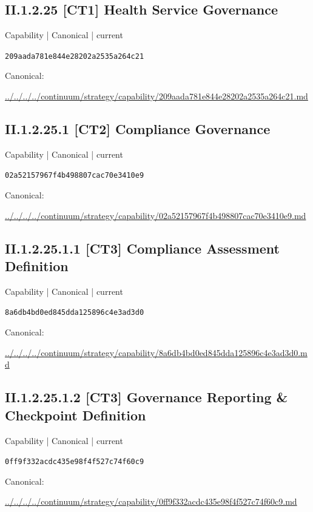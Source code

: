 \documentclass[10pt,a4paper]{article}
\begin{document}
\subsection*{II.1.2.25 [CT1] Health Service Governance}
{\small Capability | Canonical | current}\par
\texttt{209aada781e844e28202a2535a264c21}\par
Canonical: \par
{\footnotesize\url{../../../../continuum/strategy/capability/209aada781e844e28202a2535a264c21.md}}\par
\subsection*{II.1.2.25.1 [CT2] Compliance Governance}
{\small Capability | Canonical | current}\par
\texttt{02a52157967f4b498807cac70e3410e9}\par
Canonical: \par
{\footnotesize\url{../../../../continuum/strategy/capability/02a52157967f4b498807cac70e3410e9.md}}\par
\subsection*{II.1.2.25.1.1 [CT3] Compliance Assessment Definition}
{\small Capability | Canonical | current}\par
\texttt{8a6db4bd0ed845dda125896c4e3ad3d0}\par
Canonical: \par
{\footnotesize\url{../../../../continuum/strategy/capability/8a6db4bd0ed845dda125896c4e3ad3d0.md}}\par
\subsection*{II.1.2.25.1.2 [CT3] Governance Reporting \& Checkpoint Definition}
{\small Capability | Canonical | current}\par
\texttt{0ff9f332acdc435e98f4f527c74f60c9}\par
Canonical: \par
{\footnotesize\url{../../../../continuum/strategy/capability/0ff9f332acdc435e98f4f527c74f60c9.md}}\par
\end{document}
